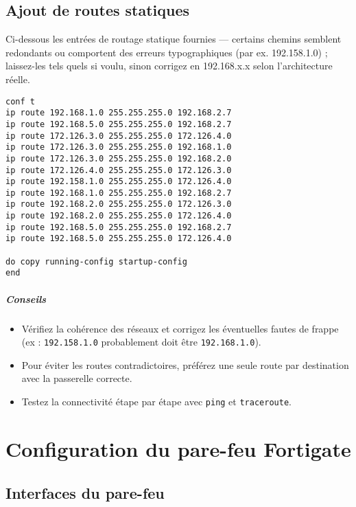 \documentclass[11pt,a4paper]{report}
\begin{document}
\section{Ajout de routes statiques}
Ci-dessous les entrées de routage statique fournies — certains chemins semblent redondants ou comportent des erreurs typographiques (par ex. 192.158.1.0) ; laissez-les tels quels si voulu, sinon corrigez en 192.168.x.x selon l'architecture réelle.

\begin{lstlisting}[language={},caption={Routes statiques - R1}]
conf t
ip route 192.168.1.0 255.255.255.0 192.168.2.7
ip route 192.168.5.0 255.255.255.0 192.168.2.7
ip route 172.126.3.0 255.255.255.0 172.126.4.0
ip route 172.126.3.0 255.255.255.0 192.168.1.0
ip route 172.126.3.0 255.255.255.0 192.168.2.0
ip route 172.126.4.0 255.255.255.0 172.126.3.0
ip route 192.158.1.0 255.255.255.0 172.126.4.0
ip route 192.168.1.0 255.255.255.0 192.168.2.7
ip route 192.168.2.0 255.255.255.0 172.126.3.0
ip route 192.168.2.0 255.255.255.0 172.126.4.0
ip route 192.168.5.0 255.255.255.0 192.168.2.7
ip route 192.168.5.0 255.255.255.0 172.126.4.0

do copy running-config startup-config
end
\end{lstlisting}

\paragraph{Conseils}
\begin{itemize}
  \item Vérifiez la cohérence des réseaux et corrigez les éventuelles fautes de frappe (ex : \texttt{192.158.1.0} probablement doit être \texttt{192.168.1.0}).
  \item Pour éviter les routes contradictoires, préférez une seule route par destination avec la passerelle correcte.
  \item Testez la connectivité étape par étape avec \texttt{ping} et \texttt{traceroute}.
\end{itemize}

\chapter{Configuration du pare-feu Fortigate}
\label{ch:parefeu}

\section{Interfaces du pare-feu}
\end{document}
